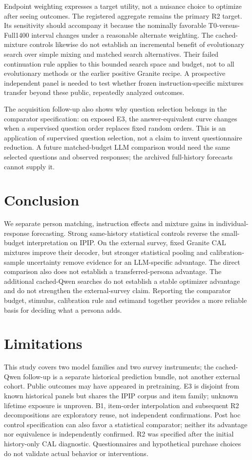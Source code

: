 \documentclass[11pt]{article}
\begin{document}
Endpoint weighting expresses a target utility, not a nuisance choice to optimize after seeing outcomes. The registered aggregate remains the primary R2 target. Its sensitivity should accompany it because the nominally favorable T0-versus-Full1400 interval changes under a reasonable alternate weighting. The cached-mixture controls likewise do not establish an incremental benefit of evolutionary search over simple mixing and matched search alternatives. Their failed continuation rule applies to this bounded search space and budget, not to all evolutionary methods or the earlier positive Granite recipe. A prospective independent panel is needed to test whether frozen instruction-specific mixtures transfer beyond these public, repeatedly analyzed outcomes.

The acquisition follow-up also shows why question selection belongs in the comparator specification: on exposed E3, the answer-equivalent curve changes when a supervised question order replaces fixed random orders. This is an application of supervised question selection, not a claim to invent questionnaire reduction. A future matched-budget LLM comparison would need the same selected questions and observed responses; the archived full-history forecasts cannot supply it.

\section{Conclusion}
We separate person matching, instruction effects and mixture gains in individual-response forecasting. Strong same-history statistical controls reverse the small-budget interpretation on IPIP. On the external survey, fixed Granite CAL mixtures improve their decoder, but stronger statistical pooling and calibration-sample uncertainty remove evidence for an LLM-specific advantage. The direct comparison also does not establish a transferred-persona advantage. The additional cached-Qwen searches do not establish a stable optimizer advantage and do not strengthen the external-survey claim. Reporting the comparator budget, stimulus, calibration rule and estimand together provides a more reliable basis for deciding what a persona adds.

\section*{Limitations}
This study covers two model families and two survey instruments; the cached-Qwen follow-up is a separate historical prediction bundle, not another external cohort. Public outcomes may have appeared in pretraining. E3 is disjoint from known historical panels but shares the IPIP corpus and item family; unknown lifetime exposure is unproven. B1, item-order interpolation and subsequent R2 decompositions are exploratory reuse, not independent confirmations. Post hoc control specification can also favor a statistical comparator; neither its advantage nor equivalence is independently confirmed. R2 was specified after the initial history-only CAL diagnostic. Questionnaires and hypothetical purchase choices do not validate actual behavior or interventions.
\end{document}
